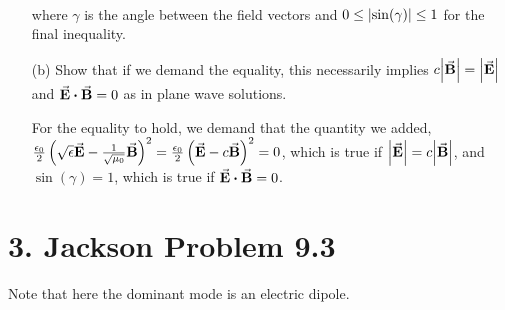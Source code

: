 \documentclass[a4paper,twoside]{article}
\begin{document}
\begin{itemize}
\begin{problem}
\begin{align}
            \end{align}
            where $ \gamma $ is the angle between the field vectors and $ 0 \leq \abs{\sin(\gamma)} \leq 1 $ for the final inequality.
        \end{problem}
    \item[(b)] Show that if we demand the equality, this necessarily implies $ c \abs{ \va{B}} = \abs{ \va{E}} $ and $ \va{E} \vdot \va{B} = 0 $ as in plane wave solutions.
        \begin{problem}
            For the equality to hold, we demand that the quantity we added, $ \frac{\epsilon_0}{2} \left( \sqrt{\epsilon} \va{E} - \frac{1}{\sqrt{\mu_0}} \va{B} \right)^2 = \frac{\epsilon_0}{2} \left( \va{E} - c \va{B} \right)^2 = 0 $, which is true if $ \abs{ \va{E}} = c \abs{ \va{B}} $, and $ \sin(\gamma) = 1 $, which is true if $ \va{E} \vdot \va{B} = 0 $. 
        \end{problem}
\end{itemize}

\section*{3. Jackson Problem 9.3}
Note that here the dominant mode is an electric dipole.
\end{document}
